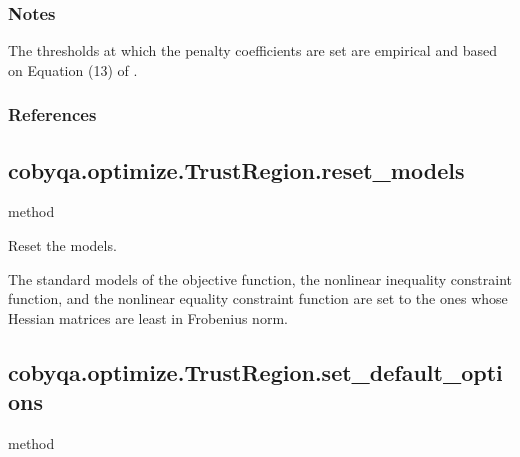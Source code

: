 \documentclass[letterpaper,10pt,english]{sphinxmanual}
\begin{document}
\begin{fulllineitems}
\begin{fulllineitems}
\subsubsection*{Notes}

\sphinxAtStartPar
The thresholds at which the penalty coefficients are set are empirical
and based on Equation (13) of .
\subsubsection*{References}

\sphinxAtStartPar
{}

\end{fulllineitems}



\subsection{cobyqa.optimize.TrustRegion.reset\_models}
\label{\detokenize{refs/generated/cobyqa.optimize.TrustRegion.reset_models:cobyqa-optimize-trustregion-reset-models}}\label{\detokenize{refs/generated/cobyqa.optimize.TrustRegion.reset_models::doc}}
\sphinxAtStartPar
method

\begin{fulllineitems}
\label{\detokenize{refs/generated/cobyqa.optimize.TrustRegion.reset_models:cobyqa.optimize.TrustRegion.reset_models}}
\sphinxAtStartPar
Reset the models.

\sphinxAtStartPar
The standard models of the objective function, the nonlinear inequality
constraint function, and the nonlinear equality constraint function are
set to the ones whose Hessian matrices are least in Frobenius norm.

\end{fulllineitems}



\subsection{cobyqa.optimize.TrustRegion.set\_default\_options}
\label{\detokenize{refs/generated/cobyqa.optimize.TrustRegion.set_default_options:cobyqa-optimize-trustregion-set-default-options}}\label{\detokenize{refs/generated/cobyqa.optimize.TrustRegion.set_default_options::doc}}
\sphinxAtStartPar
method


\end{fulllineitems}
\end{document}
